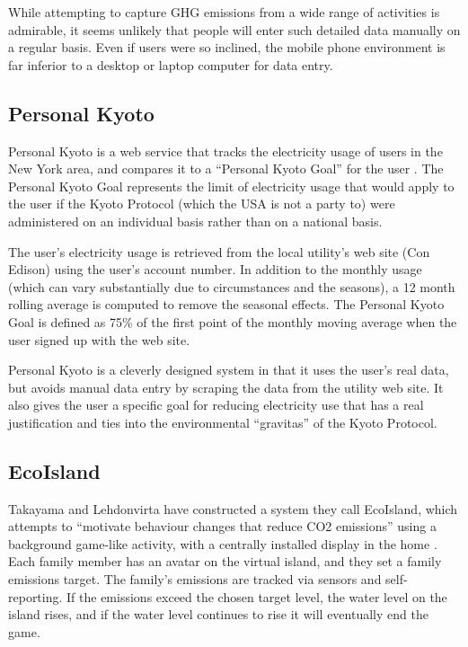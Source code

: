 While attempting to capture GHG emissions from a wide range of activities is admirable, it seems unlikely that people will enter such detailed data manually on a regular basis. Even if users were so inclined, the mobile phone environment is far inferior to a desktop or laptop computer for data entry.

\subsection{Personal Kyoto}
\label{personal-kyoto}

Personal Kyoto is a web service that tracks the electricity usage of users in the New York area, and compares it to a ``Personal Kyoto Goal'' for the user \cite{Personal-Kyoto-website}. The Personal Kyoto Goal represents the limit of electricity usage that would apply to the user if the Kyoto Protocol (which the USA is not a party to) were administered on an individual basis rather than on a national basis.

The user's electricity usage is retrieved from the local utility's web site (Con Edison) using the user's account number. In addition to the monthly usage (which can vary substantially due to circumstances and the seasons), a 12 month rolling average is computed to remove the seasonal effects. The Personal Kyoto Goal is defined as 75\% of the first point of the monthly moving average when the user signed up with the web site.

Personal Kyoto is a cleverly designed system in that it uses the user's real data, but avoids manual data entry by scraping the data from the utility web site. It also gives the user a specific goal for reducing electricity use that has a real justification and ties into the environmental ``gravitas'' of the Kyoto Protocol.

\subsection{EcoIsland}
\label{ecoisland}

Takayama and Lehdonvirta have constructed a system they call EcoIsland, which attempts to ``motivate behaviour changes that reduce CO2 emissions'' using a background game-like activity, with a centrally installed display in the home \cite{takayama-2008}. Each family member has an avatar on the virtual island, and they set a family \COtwo emissions target. The family's emissions are tracked via sensors and self-reporting. If the emissions exceed the chosen target level, the water level on the island rises, and if the water level continues to rise it will eventually end the game.

